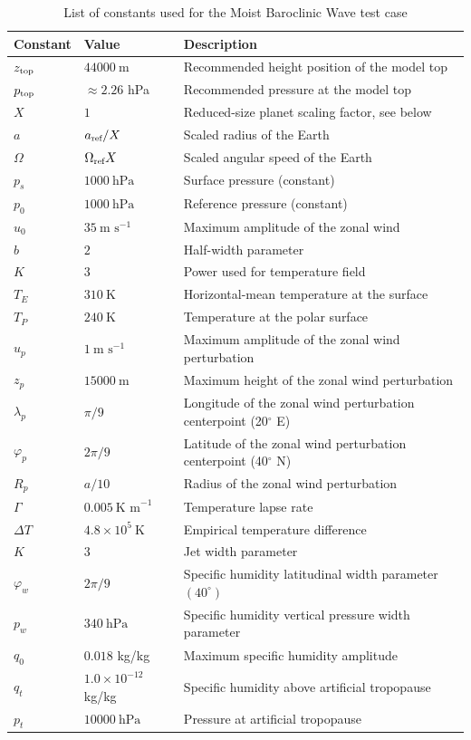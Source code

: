 \documentclass[times,doublespace]{fldauth}
\begin{document}
\begin{table}[h]

\caption{List of constants used for the Moist Baroclinic Wave test case}
\label{test4:tab}
\begin{tabular*}{\textwidth}{@{\extracolsep{\fill}}lll}
\hline Constant & Value & Description \\
\hline 
$z_{\tiny \mbox{top}}$ & $44000\ \mbox{m}$ & Recommended height position of the model top \\
$p_{\tiny \mbox{top}}$ & $\approx 2.26$ hPa & Recommended pressure at the model top\\
$X$ & $1$ & Reduced-size planet scaling factor, see below\\
$a$ & $a_{\tiny \mbox{ref}}/X$ & Scaled radius of the Earth \\
$\Omega$ & $\Omega_{\tiny \mbox{ref}}X$ & Scaled angular speed of the Earth \\
$p_s$ & $1000\ \mbox{hPa}$ & Surface pressure (constant) \\
$p_0$ & $1000\ \mbox{hPa}$ & Reference pressure (constant) \\
$u_0$ & $35\ \mbox{m\ s}^{-1}$ & Maximum amplitude of the zonal wind \\
$b$ & $2$ & Half-width parameter \\
$K$ & $3$ & Power used for temperature field \\
$T_E$ & $310\ \mbox{K}$ & Horizontal-mean temperature at the surface \\
$T_P$ & $240 \ \mbox{K}$ & Temperature at the polar surface\\
$u_p$ & $1\ \mbox{m\ s}^{-1}$ & Maximum amplitude of the zonal wind perturbation \\
$z_p$ & $15000\ \mbox{m}$ & Maximum height of the zonal wind perturbation \\
$\lambda_p$ & $\pi / 9$ & Longitude of the zonal wind perturbation centerpoint (20$^\circ$ E)\\
$\varphi_p$ & $2 \pi / 9$ & Latitude of the zonal wind perturbation centerpoint (40$^\circ$ N)\\
$R_p$ & $a / 10$ & Radius of the zonal wind perturbation \\
$\Gamma$ & $0.005\ \mbox{K\ m}^{-1}$ & Temperature lapse rate \\
$\Delta T$ & $4.8 \times 10^{5}\ \mbox{K}$ & Empirical temperature difference \\
$K$ & $3$ & Jet width parameter \\
$\varphi_w$ & $2 \pi / 9$ & Specific humidity latitudinal width parameter $(40^\circ)$\\
$p_w$ & $340\ \mbox{hPa}$ & Specific humidity vertical pressure width parameter \\
$q_0$ & $0.018$ kg/kg& Maximum specific humidity amplitude \\
$q_t$ & $1.0 \times 10^{-12}$ kg/kg & Specific humidity above artificial tropopause \\
$p_t$ & $10000\ \mbox{hPa}$ & Pressure at artificial tropopause \\  
\hline 
\end{tabular*}


\end{table}
\end{document}
